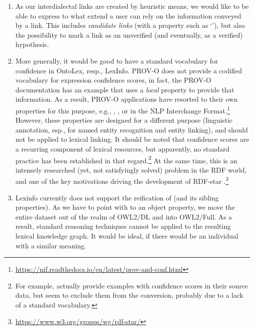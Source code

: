 \begin{enumerate}
\item As our interdialectal links are created by heuristic means, we would like to be able to express to what extend a user can rely on the information conveyed by a link. This includes \emph{candidate links} (with a property such as `'), but also the possibility to mark a link as an unverified (and eventually, as a verified) hypothesis.
\item More generally, it would be good to have a standard vocabulary for confidence in OntoLex, resp., LexInfo. 
PROV-O \cite{jing2015prov} does not provide a codified vocabulary for expression confidence scores, in fact, the PROV-O documentation has an example that uses a \emph{local} property to provide that information. As a result, PROV-O applications have resorted to their own properties for this purpose, e.g., , , or  in the NLP Interchange Format.\footnote{\url{https://nif.readthedocs.io/en/latest/prov-and-conf.html}} However, these properties are designed for a different purpose (linguistic annotation, esp., for named entity recognition and entity linking), and should not be applied to lexical linking. It should be noted that confidence scores are a recurring component of lexical resources, but apparently, no standard practice has been established in that regard.\footnote{
    For example, \cite{declerck2019using} actually provide examples with confidence scores in their source data, but seem to exclude them from the conversion, probably due to a lack of a standard vocabulary.
} 
At the same time, this is an intensely researched (yet, not satisfyingly solved) problem in the RDF world, and one of the key motivations driving the development of RDF-star \cite{rupp2024implementing}.\footnote{\url{https://www.w3.org/groups/wg/rdf-star/}}
\item Lexinfo currently does not support the reification of  (and its sibling properties). As we have to point with  to an object property, we move the entire dataset out of the realm of OWL2/DL and into OWL2/Full. As a result, standard reasoning techniques cannot be applied to the resulting lexical knowledge graph. It would be ideal, if there would be an individual with a similar meaning.
\end{enumerate}

